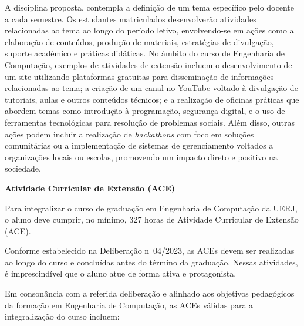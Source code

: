 A disciplina proposta, contempla a definição de um tema específico pelo docente a cada semestre. Os estudantes matriculados desenvolverão atividades relacionadas ao tema ao longo do período letivo, envolvendo-se em ações como a elaboração de conteúdos, produção de materiais, estratégias de divulgação, suporte acadêmico e práticas didáticas. No âmbito do curso de Engenharia de Computação, exemplos de atividades de extensão incluem o desenvolvimento de um site utilizando plataformas gratuitas para disseminação de informações relacionadas ao tema; a criação de um canal no YouTube voltado à divulgação de tutoriais, aulas e outros conteúdos técnicos; e a realização de oficinas práticas que abordem temas como introdução à programação, segurança digital, e o uso de ferramentas tecnológicas para resolução de problemas sociais. Além disso, outras ações podem incluir a realização de \textit{hackathons} com foco em soluções comunitárias ou a implementação de sistemas de gerenciamento voltados a organizações locais ou escolas, promovendo um impacto direto e positivo na sociedade.

\textbf{Atividade Curricular de Extensão (ACE)}

Para integralizar o curso de graduação em Engenharia de Computação da UERJ, o aluno deve cumprir, no mínimo, 327 horas de Atividade Curricular de Extensão (ACE).

Conforme estabelecido na Deliberação n\textordmasculine~04/2023, as ACEs devem ser realizadas ao longo do curso e concluídas antes do término da graduação. Nessas atividades, é imprescindível que o aluno atue de forma ativa e protagonista.

Em consonância com a referida deliberação e alinhado aos objetivos pedagógicos da formação em Engenharia de Computação, as ACEs válidas para a integralização do curso incluem:


